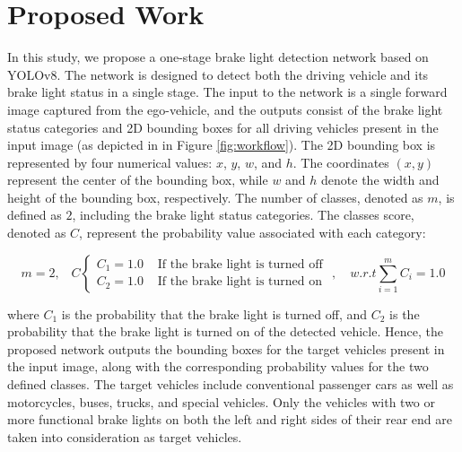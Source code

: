 \section{Proposed Work}
\label{sec:proposed}

In this study, we propose a one-stage brake light detection network based on YOLOv8. The network is designed to detect both the driving vehicle and its brake light status in a single stage. 
The input to the network is a single forward image captured from the ego-vehicle, and the outputs consist of the brake light status categories and 2D bounding boxes for all driving vehicles present in the input image (as depicted in in Figure \ref{fig:workflow}).
The 2D bounding box is represented by four numerical values: $x$, $y$, $w$, and $h$. The coordinates $(x,y)$ represent the center of the bounding box, while $w$ and $h$ denote the width and height of the bounding box, respectively. 
The number of classes, denoted as $m$, is defined as $2$, including the brake light status categories.
The classes score, denoted as $C$, represent the probability value associated with each category:

\begin{equation}
    m=2, \;\;\; C   \begin{cases}
        C_{1}=1.0 & \text{ If the brake light is turned off } \\
        C_{2}=1.0 & \text{ If the brake light is turned on }
        \end{cases}
        , \quad w.r.t \sum_{i=1}^{m}{C_{i}}=1.0
\end{equation}

where $C_{1}$ is the probability that the brake light is turned off, and $C_{2}$ is the probability that the brake light is turned on of the detected vehicle.
Hence, the proposed network outputs the bounding boxes for the target vehicles present in the input image, along with the corresponding probability values for the two defined classes.
The target vehicles include conventional passenger cars as well as motorcycles, buses, trucks, and special vehicles.
Only the vehicles with two or more functional brake lights on both the left and right sides of their rear end are taken into consideration as target vehicles.

